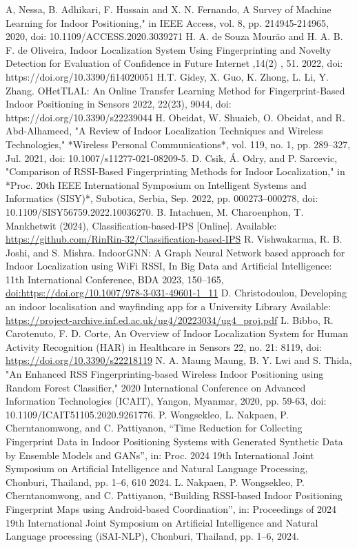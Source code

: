 \documentclass[conference]{IEEEtran}
\begin{document}
	\begin{thebibliography}{00}
		 A, Nessa, B. Adhikari, F. Hussain and X. N. Fernando, A Survey of Machine Learning for Indoor Positioning," in IEEE Access, vol. 8, pp. 214945-214965, 2020, doi: 10.1109/ACCESS.2020.3039271
		 H. A. de Souza Mourão and H. A. B. F. de Oliveira, Indoor Localization System Using Fingerprinting and Novelty Detection for Evaluation of Confidence in Future Internet ,14(2) , 51. 2022, doi:  https://doi.org/10.3390/fi14020051 
		 H.T. Gidey, X. Guo, K. Zhong, L. Li, Y. Zhang. OHetTLAL: An Online Transfer Learning Method for Fingerprint-Based Indoor Positioning in  Sensors 2022, 22(23), 9044, doi: https://doi.org/10.3390/s22239044
		 H. Obeidat, W. Shuaieb, O. Obeidat, and R. Abd-Alhameed, "A Review of Indoor Localization Techniques and Wireless Technologies," *Wireless Personal Communications*, vol. 119, no. 1, pp. 289–327, Jul. 2021, doi: 10.1007/s11277-021-08209-5.
		 D. Csik, Á. Odry, and P. Sarcevic, "Comparison of RSSI-Based Fingerprinting Methods for Indoor Localization," in *Proc. 20th IEEE International Symposium on Intelligent Systems and Informatics (SISY)*, Subotica, Serbia, Sep. 2022, pp. 000273–000278, doi: 10.1109/SISY56759.2022.10036270.
		 B. Intachuen, M. Charoenphon, T. Mankhetwit (2024), Classification-based-IPS [Online]. Available: \url{https://github.com/RinRin-32/Classification-based-IPS}
		 R. Vishwakarma, R. B. Joshi, and S. Mishra. IndoorGNN: A Graph Neural Network based approach for Indoor Localization using WiFi RSSI, In Big Data and Artificial Intelligence: 11th International Conference, BDA 2023, 150–165, \url{doi:https://doi.org/10.1007/978-3-031-49601-1_11}
		 D. Christodoulou,  Developing an indoor localisation and wayfinding app for a University Library Available: \url{https://project-archive.inf.ed.ac.uk/ug4/20223034/ug4_proj.pdf}
		 L. Bibbo, R. Carotenuto, F. D. Corte, An Overview of Indoor Localization System for Human Activity Recognition (HAR) in Healthcare in Sensors 22, no. 21: 8119, doi: \url{https://doi.org/10.3390/s22218119}
		N. A. Maung Maung, B. Y. Lwi and S. Thida, "An Enhanced RSS Fingerprinting-based Wireless Indoor Positioning using Random Forest Classifier," 2020 International Conference on Advanced Information Technologies (ICAIT), Yangon, Myanmar, 2020, pp. 59-63, doi: 10.1109/ICAIT51105.2020.9261776.
		P. Wongsekleo, L. Nakpaen, P. Cherntanomwong, and C. Pattiyanon, “Time Reduction for Collecting Fingerprint Data in Indoor Positioning Systems with Generated Synthetic Data by Ensemble Models and GANs”, in: Proc. 2024 19th International Joint Symposium on Artificial Intelligence and Natural Language Processing, Chonburi, Thailand, pp. 1–6, 610 2024. 
		L. Nakpaen, P. Wongsekleo, P. Cherntanomwong, and C. Pattiyanon, “Building RSSI-based Indoor Positioning Fingerprint Maps using Android-based Coordination”, in: Proceedings of 2024 19th International Joint Symposium on Artificial Intelligence and Natural Language processing (iSAI-NLP), Chonburi, Thailand, pp. 1–6, 2024.
		
	\end{thebibliography}
\end{document}

